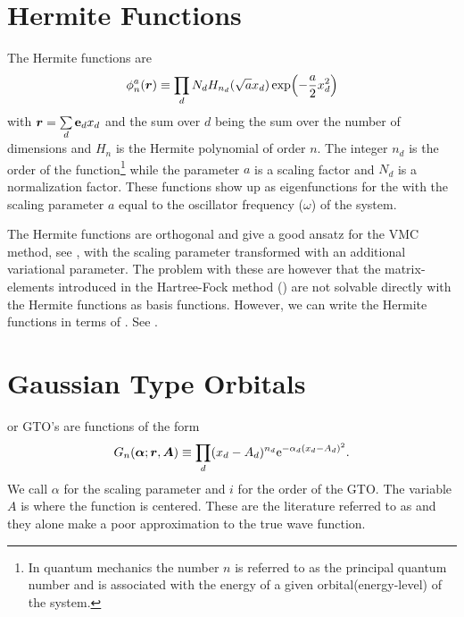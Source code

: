 \section{Hermite Functions}
    The Hermite functions are
        \begin{equation}
            \phi^a_n(\boldsymbol{{r}}) \equiv \prod_d N_d
            H_{n_d}(\sqrt{a}x_d)\exp(-\frac{a}{2}x^2_d)
            \label{eq:HermiteFunc}
        \end{equation}
    with $\boldsymbol{{r}} = \sum\limits_d \boldsymbol{{\mathrm{e}}}_dx_d$ and the sum over $d$ being
    the sum over the number of dimensions and $H_n$ is the Hermite polynomial
    of order $n$. The integer $n_d$ is the order of the function\footnote{In
    quantum mechanics the number $n$ is referred to as the principal quantum
    number and is associated with the energy of a given orbital(energy-level)
    of the system.} while the parameter $a$ is a scaling factor and $N_d$ is a
    normalization factor. These functions show up as eigenfunctions for the
     \cite{GriffQuan} with the scaling
    parameter $a$ equal to the oscillator frequency ($\omega$) of the system.

    The Hermite functions are orthogonal and give a good ansatz for the VMC
    method, see , with the scaling parameter transformed with an
    additional variational parameter. The problem with these are however that
    the matrix-elements introduced in the Hartree-Fock method
    () are not solvable directly with the Hermite functions
    as basis functions. However, we can write the Hermite functions in terms of
    . See .

\section{Gaussian Type Orbitals}
     or GTO's are functions of the form
    \cite{HelgakerMolElcTheory}
        \begin{equation}
            G_n(\boldsymbol{{\alpha}};\boldsymbol{{r}},\boldsymbol{{A}}) \equiv \prod_d (x_d-A_d)^{n_d}
            \mathrm{e}^{-\alpha_d (x_d-A_d)^2}.
            \label{eq:GTOdef1d}
        \end{equation}
    We call $\alpha$ for the scaling parameter and $i$ for the order of the
    GTO. The variable $A$ is where the function is centered. These are the
    literature referred to as  and they alone make
    a poor approximation to the true wave function.

